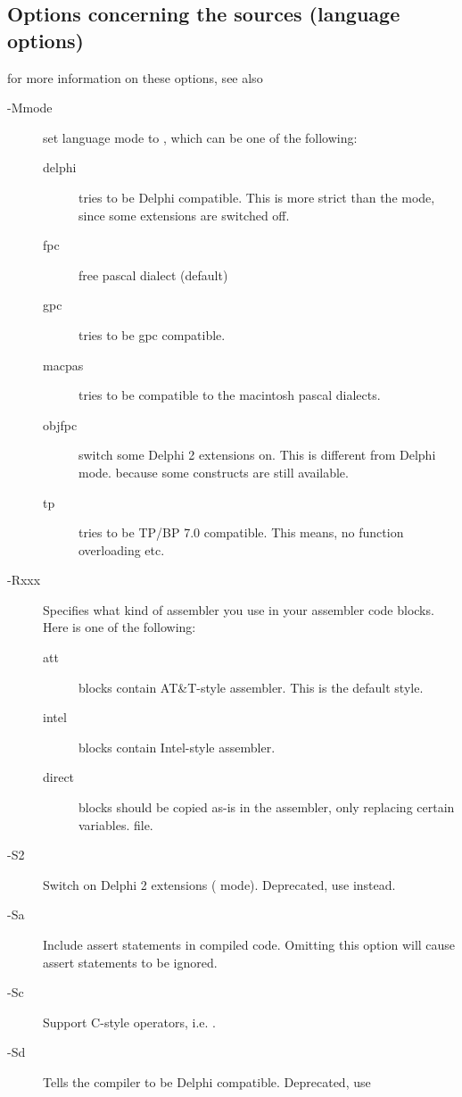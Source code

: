 \subsection{Options concerning the sources (language options)}
\label{se:sourceoptions}
for more information on these options, see also \progref
\begin{description}
\item[-Mmode] set language mode to , which can be one of the
following:
\begin{description}
\item[delphi] tries to be Delphi compatible. This is more strict
than the  mode, since some \fpc extensions are switched off.
\item[fpc] free pascal dialect (default)
\item[gpc] tries to be gpc compatible.
\item[macpas] tries to be compatible to the macintosh pascal dialects.
\item[objfpc] switch some Delphi 2 extensions on. This is different from 
Delphi mode. because some \fpc constructs are still available.
\item[tp] tries to be TP/BP 7.0 compatible. This means, no function overloading
etc.
\end{description}
\item [-Rxxx]  Specifies what kind of assembler you use in
your  assembler code blocks. Here  is one of the following:
\begin{description}
\item [att\ ]  blocks contain AT\&T-style  assembler.
This is the default style.
\item [intel]  blocks contain Intel-style assembler.
\item [direct]  blocks should be copied as-is in the assembler,
only replacing certain variables.
file.
\end{description}
\item [-S2]  Switch on Delphi 2 extensions ( mode). 
Deprecated, use  instead.
\item [-Sa]  Include assert statements in compiled code. Omitting 
this option will cause assert statements to be ignored.
\item [-Sc]  Support C-style operators, i.e. .
\item [-Sd]  Tells the compiler to be Delphi compatible. Deprecated, use

\end{description}
